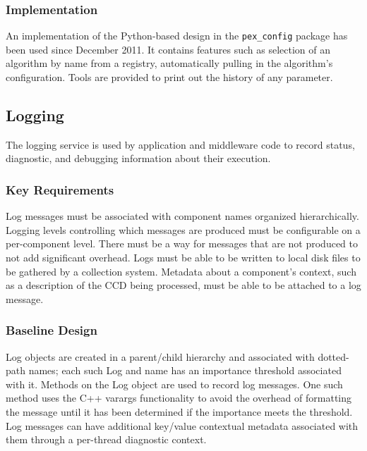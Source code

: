 \documentclass[DM,lsstdraft,toc]{lsstdoc}
\begin{document}
\subsubsection{Implementation}\label{configuration-implementation}

An implementation of the Python-based design in the \texttt{pex\_config}
package has been used since December 2011. It contains features such as
selection of an algorithm by name from a registry, automatically pulling in the
algorithm's configuration. Tools are provided to print out the history of any
parameter.


\subsection{Logging}\label{logging}

The logging service is used by application and middleware code to record
status, diagnostic, and debugging information about their execution.

\subsubsection{Key Requirements}\label{logging-reqs}

Log messages must be associated with component names organized
hierarchically. Logging levels controlling which messages are produced
must be configurable on a per-component level. There must be a way for
messages that are not produced to not add significant overhead.
Logs must be able to
be written to local disk files to be gathered by a collection system.
Metadata about a component's context, such as a description of the CCD
being processed, must be able to be attached to a log message.

\subsubsection{Baseline Design}\label{logging-design}

Log objects are created in a parent/child hierarchy and associated with
dotted-path names; each such Log and name has an importance threshold
associated with it. Methods on the Log object are used to record log messages.
One such method uses the C++ varargs functionality to avoid the overhead of
formatting the message until it has been determined if the importance meets the
threshold. Log messages can have additional key/value contextual metadata
associated with them through a per-thread diagnostic context.
\end{document}

